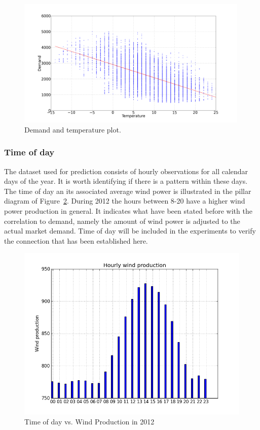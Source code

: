 \begin{figure}[H]
\centering
\includegraphics[width=0.99\textwidth]{billeder/energy_price_plots/consump_temp.png}
\caption{Demand and temperature plot.}
\label{fig:consump_temp_green}
\end{figure}

\subsubsection{Time of day}
\label{sec:greenTOD}
The dataset used for prediction consists of hourly observations for all calendar days of the year. It is worth identifying if there is a pattern within these days. The time of day an its associated average wind power is illustrated in the pillar diagram of Figure~\ref{fig:hourly_wind_production}. During 2012 the hours between 8-20 have a higher wind power production in general. It indicates what have been stated before with the correlation to demand, namely the amount of wind power is adjusted to the actual market demand. Time of day will be included in the experiments to verify the connection that has been established here. 

\begin{figure}[H]
\centering
\includegraphics[width=0.8\linewidth]{billeder/hourly_wind_production.png}
\caption{Time of day vs. Wind Production in 2012}
\label{fig:hourly_wind_production}
\end{figure}

